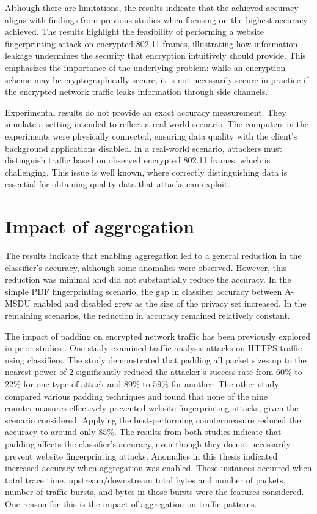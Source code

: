 Although there are limitations, the results indicate that the achieved accuracy aligns with findings from previous studies when focusing on the highest accuracy achieved. The results highlight the feasibility of performing a website fingerprinting attack on encrypted 802.11 frames, illustrating how information leakage undermines the security that encryption intuitively should provide. This emphasizes the importance of the underlying problem: while an encryption scheme may be cryptographically secure, it is not necessarily secure in practice if the encrypted network traffic leaks information through side channels.

Experimental results do not provide an exact accuracy measurement. They simulate a setting intended to reflect a real-world scenario. The computers in the experiments were physically connected, ensuring data quality with the client's background applications disabled. In a real-world scenario, attackers must distinguish traffic based on observed encrypted 802.11 frames, which is challenging. This issue is well known, where correctly distinguishing data is essential for obtaining quality data that attacks can exploit.

\section{Impact of aggregation\label{sec:aggregation-discussion}}

The results indicate that enabling aggregation led to a general reduction in the classifier's accuracy, although some anomalies were observed. However, this reduction was minimal and did not substantially reduce the accuracy. In the simple PDF fingerprinting scenario, the gap in classifier accuracy between A-MSDU enabled and disabled grew as the size of the privacy set increased. In the remaining scenarios, the reduction in accuracy remained relatively constant.

The impact of padding on encrypted network traffic has been previously explored in prior studies \cite{DBLP:conf/sp/DyerCRS12, DBLP:conf/pet/MillerHJT14}. One study \cite{DBLP:conf/pet/MillerHJT14} examined traffic analysis attacks on HTTPS traffic using classifiers. The study demonstrated that padding all packet sizes up to the nearest power of $2$ significantly reduced the attacker's success rate from $60\%$ to $22\%$ for one type of attack and $89\%$ to $59\%$ for another. The other study \cite{DBLP:conf/sp/DyerCRS12} compared various padding techniques and found that none of the nine countermeasures effectively prevented website fingerprinting attacks, given the scenario considered. Applying the best-performing countermeasure reduced the accuracy to around only $85\%$. The results from both studies indicate that padding affects the classifier's accuracy, even though they do not necessarily prevent website fingerprinting attacks. Anomalies in this thesis indicated increased accuracy when aggregation was enabled. These instances occurred when total trace time, upstream/downstream total bytes and number of packets, number of traffic bursts, and bytes in those bursts were the features considered. One reason for this is the impact of aggregation on traffic patterns.

